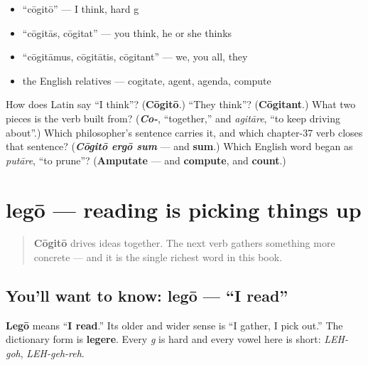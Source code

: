 \begin{itemize}
\raggedright
  \item \textquotedblleft{}cōgitō\textquotedblright{} — I think, hard g
  \item \textquotedblleft{}cōgitās, cōgitat\textquotedblright{} — you think, he or she thinks
  \item \textquotedblleft{}cōgitāmus, cōgitātis, cōgitant\textquotedblright{} — we, you all, they
  \item the English relatives — cogitate, agent, agenda, compute
\end{itemize}

\begin{tcolorbox}[breakable,colback=teal!4,colframe=teal!35!black,title={Before you move on}]
How does Latin say \textquotedblleft{}I think\textquotedblright{}? (\textbf{Cōgitō}.) \textquotedblleft{}They think\textquotedblright{}? (\textbf{Cōgitant}.) What two pieces is the verb built from? (\emph{\textbf{Co-}}, \textquotedblleft{}together,\textquotedblright{} and \emph{agitāre}, \textquotedblleft{}to keep driving about\textquotedblright{}.) Which philosopher's sentence carries it, and which chapter-37 verb closes that sentence? (\emph{\textbf{Cōgitō ergō sum}} — and \textbf{sum}.) Which English word began as \emph{putāre}, \textquotedblleft{}to prune\textquotedblright{}? (\textbf{Amputate} — and \textbf{compute}, and \textbf{count}.)
\end{tcolorbox}
\section[legō, legere]{legō — reading is picking things up}

\label{lesson:LA-C38-lego}



\begin{quote}
\textbf{Cōgitō} drives ideas together. The next verb gathers something more concrete — and it is the single richest word in this book.
\end{quote}

\subsection*{You'll want to know: legō — \textquotedblleft{}I read\textquotedblright{}}
\textbf{Legō} means \textquotedblleft{}\textbf{I read}.\textquotedblright{} Its older and wider sense is \textquotedblleft{}I gather, I pick out.\textquotedblright{} The dictionary form is \textbf{legere}. Every \emph{g} is hard and every vowel here is short: \emph{LEH-goh}, \emph{LEH-geh-reh}.

